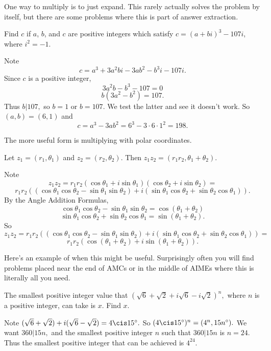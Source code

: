 \documentclass{article}
\begin{document}
One way to multiply is to just expand. This rarely actually solves the problem by itself, but there are some problems where this is part of answer extraction.

\begin{exam}[AIME 1985/3]
Find $c$ if $a$, $b$, and $c$ are positive integers which satisfy $c=(a + bi)^3 - 107i$, where $i^2 = -1$.
\end{exam}

\begin{sol}
Note
\[c=a^3+3a^2bi-3ab^2-b^3i-107i.\]
Since $c$ is a positive integer,
\[3a^2b-b^3-107=0\]
\[b(3a^2-b^2)=107.\]
Thus $b|107,$ so $b=1$ or $b=107.$ We test the latter and see it doesn't work. So $(a,b)=(6,1)$ and
\[c=a^3-3ab^2=6^3-3\cdot 6\cdot 1^2=198.\]
\end{sol}

The more useful form is multiplying with polar coordinates.

\begin{theo}
Let $z_1=(r_1,\theta_1)$ and $z_2=(r_2,\theta_2).$ Then $z_1z_2=(r_1r_2,\theta_1+\theta_2).$
\end{theo}

\begin{pro}
Note
\[z_1z_2=r_1r_2(\cos\theta_1+i\sin\theta_1)(\cos\theta_2+i\sin\theta_2)=\]
\[r_1r_2((\cos\theta_1\cos\theta_2-\sin\theta_1\sin\theta_2)+i(\sin\theta_1\cos\theta_2+\sin\theta_2\cos\theta_1)).\]
By the Angle Addition Formulas,
\[\cos\theta_1\cos\theta_2-\sin\theta_1\sin\theta_2=\cos(\theta_1+\theta_2)\]
\[\sin\theta_1\cos\theta_2+\sin\theta_2\cos\theta_1=\sin(\theta_1+\theta_2).\]
So
\[z_1z_2=r_1r_2((\cos\theta_1\cos\theta_2-\sin\theta_1\sin\theta_2)+i(\sin\theta_1\cos\theta_2+\sin\theta_2\cos\theta_1))=\]
\[r_1r_2(\cos(\theta_1+\theta_2)+i\sin(\theta_1+\theta_2)).\]
\end{pro}

Here's an example of when this might be useful. Surprisingly often you will find problems placed near the end of AMCs or in the middle of AIMEs where this is literally all you need.

\begin{exam}
The smallest positive integer value that $(\sqrt{6}+\sqrt{2}+i\sqrt{6}-i\sqrt{2})^n,$ where $n$ is a positive integer, can take is $x.$ Find $x.$
\end{exam}

\begin{sol}
Note $(\sqrt{6}+\sqrt{2})+i(\sqrt{6}-\sqrt{2})=4\cis 15^{\circ}.$ So $(4\cis 15^{\circ})^n=(4^n,15n^{\circ}).$ We want $360|15n,$ and the smallest positive integer $n$ such that $360|15n$ is $n=24.$ Thus the smallest positive integer that can be achieved is $4^{24}.$
\end{sol}
\end{document}
